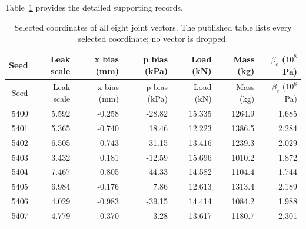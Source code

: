 \documentclass[11pt,a4paper]{article}
\begin{document}
\begingroup\hypersetup{hypertexnames=true}\small\setlength{\tabcolsep}{4pt}
Table~\ref{supp:longtable:4} provides the detailed supporting records.
\begin{longtable}{rrrrrrr}
\caption{Selected coordinates of all eight joint vectors. The published table lists every selected coordinate; no vector is dropped.}\label{supp:longtable:4}\\\toprule
Seed & Leak scale & x bias (mm) & p bias (kPa) & Load (kN) & Mass (kg) & $\beta_e$ ($10^8$ Pa)\\\midrule\endfirsthead
\toprule
Seed & Leak scale & x bias (mm) & p bias (kPa) & Load (kN) & Mass (kg) & $\beta_e$ ($10^8$ Pa)\\\midrule\endhead
5400 & 5.592 & -0.258 & -28.82 & 15.335 & 1264.9 & 1.685\\
5401 & 5.365 & -0.740 & 18.46 & 12.223 & 1386.5 & 2.284\\
5402 & 6.505 & 0.743 & 31.15 & 13.416 & 1239.3 & 2.029\\
5403 & 3.432 & 0.181 & -12.59 & 15.696 & 1010.2 & 1.872\\
5404 & 7.467 & 0.805 & 44.33 & 14.582 & 1104.4 & 1.744\\
5405 & 6.984 & -0.176 & 7.86 & 12.613 & 1313.4 & 2.189\\
5406 & 4.029 & -0.983 & -39.15 & 14.414 & 1084.2 & 1.988\\
5407 & 4.779 & 0.370 & -3.28 & 13.617 & 1180.7 & 2.301\\
\bottomrule\end{longtable}\endgroup
\end{document}

